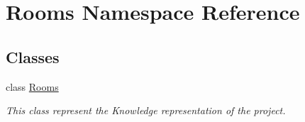 \hypertarget{namespaceRooms}{}\section{Rooms Namespace Reference}
\label{namespaceRooms}
\subsection*{Classes}
\begin{DoxyCompactItemize}
\item 
class \hyperlink{classRooms_1_1Rooms}{Rooms}
\begin{DoxyCompactList}\small\item\em This class represent the Knowledge representation of the project. \end{DoxyCompactList}\end{DoxyCompactItemize}

